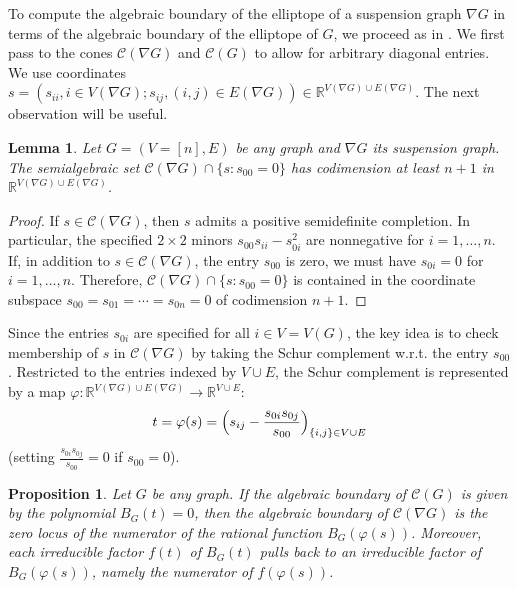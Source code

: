\documentclass[a4paper, 11pt, twoside]{article}
\newcommand{\R}{\mathbb{R}}
\newcommand{\MCscr}{{\mathscr {C}}}
\theoremstyle{plain}
\newtheorem{lemma}[theorem]{Lemma}
\newtheorem{proposition}[theorem]{Proposition}
\begin{document}
To compute the algebraic boundary of the elliptope of a suspension graph $\nabla G$ in terms of the algebraic boundary of the elliptope of $G$, we proceed as in \cite[Sec. 4.3]{Sturmfels2010MultivariateGaussians}. We first pass to the cones $\MCscr (\nabla G)$ and $\MCscr (G)$ to allow for arbitrary diagonal entries. We use coordinates $s = (s_{ii}, i \in V(\nabla G);  s_{ij}, (i,j) \in E(\nabla G)) \in \R^{V(\nabla G)\cup E(\nabla G)}$. 
The next observation will be useful.
\begin{lemma} \label{lem:s00}
Let $G = (V = [n], E)$ be any graph and $\nabla G$ its suspension graph. The semialgebraic set $\MCscr(\nabla G) \cap \{ s: s_{00} = 0 \}$ has codimension at least $n + 1$ in $\mathbb{R}^{V(\nabla G) \cup E(\nabla G)}$. 
\end{lemma}
\begin{proof}
If $s \in \MCscr(\nabla G)$, then $s$ admits a positive semidefinite  completion. In particular, the specified $2 \times 2$ minors $s_{00}s_{ii}-s_{0i}^2$ are nonnegative for $i = 1, \ldots, n$. If, in addition to $s \in \MCscr(\nabla G)$, the entry $s_{00}$ is zero, we must have $s_{0i} = 0$ for $i = 1, \ldots, n$. Therefore, $\MCscr(\nabla G) \cap \{ s: s_{00} = 0 \}$ is contained in the coordinate subspace $s_{00}= s_{01} = \cdots = s_{0n} = 0$ of codimension $n + 1$. 
\end{proof}
Since the entries  $s_{0i}$ are specified for all $i\in V = V(G)$, the key idea is to check membership  of $s$ in $\MCscr(\nabla G)$ by taking the Schur complement w.r.t. the entry $s_{00}$.
Restricted to the entries indexed by $V \cup E$, the Schur complement is represented by a map $\varphi: \mathbb{R}^{V(\nabla G) \cup E(\nabla G)} \rightarrow \mathbb{R}^{V \cup E}$:
\begin{align}\label{eq:tphis}
t=\varphi(s)=\Big(s_{ij}- {s_{0i}s_{0j}\over s_{00}}\Big)_{\{i,j\}\in V\cup E}
\end{align}
(setting $\tfrac{s_{0i}s_{0j}}{ s_{00}}=0$ if $s_{00}=0$).

\begin{proposition} \label{prop:suspension}
Let $G$ be any graph. If the algebraic boundary of $\MCscr(G)$ is given by the polynomial $B_G(t) = 0$, then the algebraic boundary of $\MCscr(\nabla G)$ is the zero locus of the numerator of the rational function $B_G(\varphi(s))$. Moreover, each irreducible factor $f(t)$ of $B_G(t)$ pulls back to an irreducible factor of $B_G(\varphi(s))$, namely the numerator of $f(\varphi(s))$. 
\end{proposition}
\end{document}
